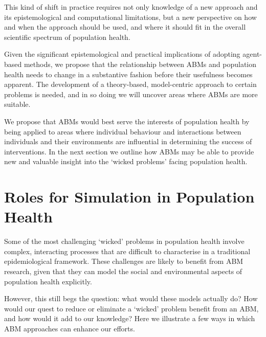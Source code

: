 \documentclass[review]{elsarticle}
\begin{document}
This kind of shift in practice requires not only knowledge of a new approach and its epistemological and computational limitations, but a new perspective on how and when the approach should be used, and where it should fit in the overall scientific spectrum of population health.

Given the significant epistemological and practical implications of adopting agent-based methods, we propose that the relationship between ABMs and population health needs to change in a substantive fashion before their usefulness becomes apparent.  The development of a theory-based, model-centric approach to certain problems is needed, and in so doing we will uncover areas where ABMs are more suitable.

We propose that ABMs would best serve the interests of population health by being applied to areas where individual behaviour and interactions between individuals and their environments are influential in determining the success of interventions.  In the next section we outline how ABMs may be able to provide new and valuable insight into the `wicked problems' facing population health.


\section{Roles for Simulation in Population Health}

Some of the most challenging `wicked' problems in population health involve complex, interacting processes that are difficult to characterise in a traditional epidemiological framework.  These challenges are likely to benefit from ABM research, given that they can model the social and environmental aspects of population health explicitly.

However, this still begs the question: what would these models actually do?  How would our quest to reduce or eliminate a `wicked' problem benefit from an ABM, and how would it add to our knowledge?  Here we illustrate a few ways in which ABM approaches can enhance our efforts.
\end{document}

